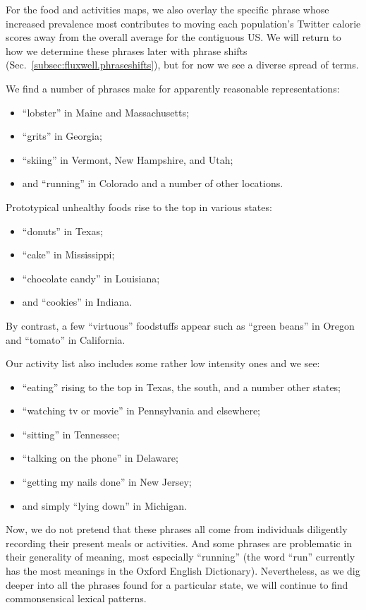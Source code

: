 For the food and activities maps,
we also overlay the specific phrase whose increased prevalence
most contributes to moving each population's Twitter calorie scores away
from the overall average for the contiguous US.
We will return to how we determine these phrases
later with phrase shifts (Sec.~\ref{subsec:fluxwell.phraseshifts}),
but for now we see a diverse spread of terms.

We find a number of phrases make for 
apparently reasonable representations:
\begin{itemize}
\item 
``lobster'' in Maine and Massachusetts;
\item 
``grits'' in Georgia;
\item 
``skiing'' in Vermont, New Hampshire, and Utah;
\item 
and
``running'' in Colorado and a number of other locations.
\end{itemize}

Prototypical unhealthy foods rise to the top in various states:
\begin{itemize}
\item 
``donuts'' in Texas;
\item 
``cake'' in Mississippi;
\item 
``chocolate candy'' in Louisiana;
\item 
and ``cookies'' in Indiana.
\end{itemize}
By contrast, a few ``virtuous'' foodstuffs appear such as ``green beans''
in Oregon and ``tomato'' in California.

Our activity list also includes some rather low intensity
ones and we see:
\begin{itemize}
\item 
  ``eating'' rising to the top in Texas, the south, and a number other states;
\item 
  ``watching tv or movie'' in Pennsylvania and elsewhere;
\item 
  ``sitting'' in Tennessee;
\item 
  ``talking on the phone'' in Delaware;
\item 
  ``getting my nails done'' in New Jersey;
\item 
  and simply
  ``lying down'' in Michigan.
\end{itemize}

Now, we do not pretend that these phrases all
come from individuals diligently recording
their present meals or activities.
And some phrases are problematic in their 
generality of meaning, most especially ``running''
(the word ``run'' currently has the most meanings
in the Oxford English Dictionary).
Nevertheless, as we dig deeper into all the phrases
found for a particular state, 
we will continue to find commonsensical lexical patterns.

